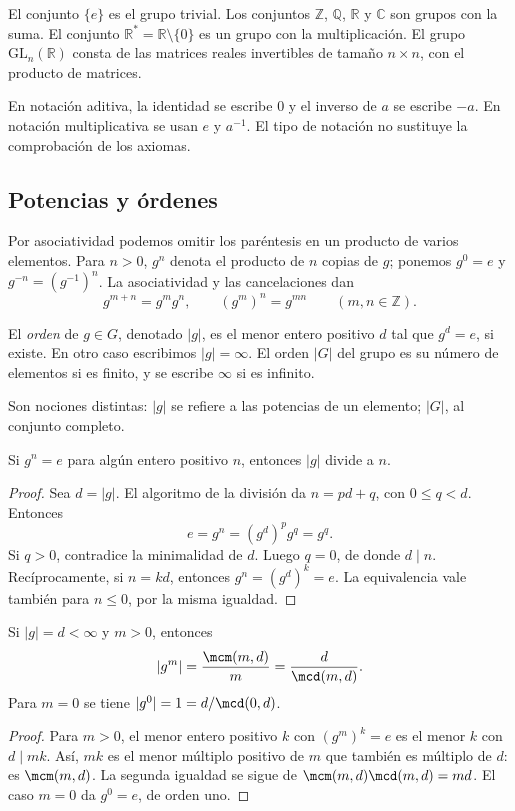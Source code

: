 \begin{ejem}
El conjunto $\{e\}$ es el grupo trivial. Los conjuntos $\mathbb Z$, $\mathbb Q$, $\mathbb R$ y $\mathbb C$ son grupos con la suma. El conjunto $\mathbb R^*=\mathbb R\setminus\{0\}$ es un grupo con la multiplicación. El grupo $\mathrm{GL}_n(\mathbb R)$ consta de las matrices reales invertibles de tamaño $n\times n$, con el producto de matrices.
\end{ejem}
En notación aditiva, la identidad se escribe $0$ y el inverso de $a$ se escribe $-a$. En notación multiplicativa se usan $e$ y $a^{-1}$. El tipo de notación no sustituye la comprobación de los axiomas.

\subsection{Potencias y órdenes}
Por asociatividad podemos omitir los paréntesis en un producto de varios elementos. Para $n>0$, $g^n$ denota el producto de $n$ copias de $g$; ponemos $g^0=e$ y $g^{-n}=(g^{-1})^n$. La asociatividad y las cancelaciones dan
\[
g^{m+n}=g^mg^n,\qquad (g^m)^n=g^{mn}\qquad(m,n\in\mathbb Z).
\]
\begin{defi}
El \emph{orden} de $g\in G$, denotado $|g|$, es el menor entero positivo $d$ tal que $g^d=e$, si existe. En otro caso escribimos $|g|=\infty$. El orden $|G|$ del grupo es su número de elementos si es finito, y se escribe $\infty$ si es infinito.
\end{defi}
Son nociones distintas: $|g|$ se refiere a las potencias de un elemento; $|G|$, al conjunto completo.

\begin{lema}\label{lema:C2-orden}
Si $g^n=e$ para algún entero positivo $n$, entonces $|g|$ divide a $n$.
\end{lema}
\begin{proof}
Sea $d=|g|$. El algoritmo de la división da $n=pd+q$, con $0\le q<d$. Entonces
\[
e=g^n=(g^d)^p g^q=g^q.
\]
Si $q>0$, contradice la minimalidad de $d$. Luego $q=0$, de donde $d\mid n$. Recíprocamente, si $n=kd$, entonces $g^n=(g^d)^k=e$. La equivalencia vale también para $n\le0$, por la misma igualdad.
\end{proof}

\begin{prop}\label{prop:C2-potencias}
Si $|g|=d<\infty$ y $m>0$, entonces
\[
|g^m|=\frac{\mcm(m,d)}m=\frac d{\mcd(m,d)}.
\]
Para $m=0$ se tiene $|g^0|=1=d/\mcd(0,d)$.
\end{prop}
\begin{proof}
Para $m>0$, el menor entero positivo $k$ con $(g^m)^k=e$ es el menor $k$ con $d\mid mk$. Así, $mk$ es el menor múltiplo positivo de $m$ que también es múltiplo de $d$: es $\mcm(m,d)$. La segunda igualdad se sigue de $\mcm(m,d)\mcd(m,d)=md$. El caso $m=0$ da $g^0=e$, de orden uno.
\end{proof}

